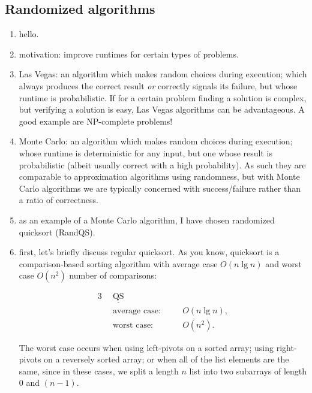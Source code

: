 

\newpage
\subsection{Randomized algorithms}

\begin{enumerate}
  \item hello.

  \item motivation: improve runtimes for certain types of problems.

  \item Las Vegas: an algorithm which makes random choices during execution;
    which always produces the correct result \emph{or} correctly signals its
    failure, but whose runtime is probabilistic. If for a certain problem
    finding a solution is complex, but verifying a solution is easy, Las Vegas
    algorithms can be advantageous. A good example are NP-complete problems!

  \item Monte Carlo: an algorithm which makes random choices during execution;
    whose runtime is deterministic for any input, but one whose result is
    probabilistic (albeit usually correct with a high probability). As such they
    are comparable to approximation algorithms using randomness, but with Monte
    Carlo algorithms we are typically concerned with success/failure rather than
    a ratio of correctness.

  \item as an example of a Monte Carlo algorithm, I have chosen randomized
    quicksort (RandQS).

  \item first, let's briefly discuss regular quicksort. As you know, quicksort
    is a comparison-based sorting algorithm with average case $O(n \lg n)$ and
    worst case $O(n^2)$ number of comparisons:

    \begin{textred}
      \begin{alignat}{3}
        &\underline{\text{QS}}&&\\
        \quad&\text{average case:}&&\quad O(n \lg n),\\
                       &\text{worst case:}  &&\quad O(n^2).
      \end{alignat}
    \end{textred}

    The worst case occurs when using left-pivots on a sorted array; using
    right-pivots on a reversely sorted array; or when all of the list elements
    are the same, since in these cases, we split a length $n$ list into two
    subarrays of length $0$ and $(n - 1)$.


\end{enumerate}
